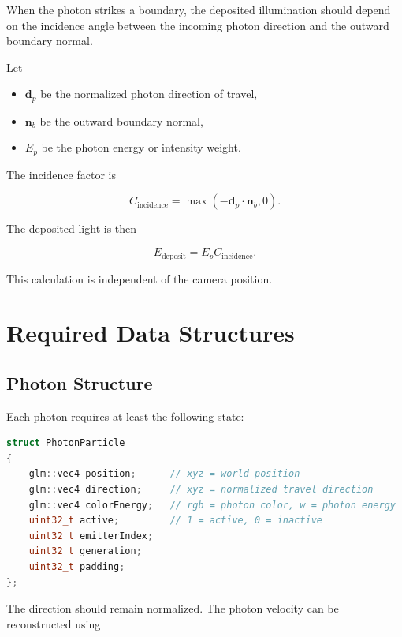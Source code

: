 \documentclass[11pt]{article}
\begin{document}
When the photon strikes a boundary, the deposited illumination should depend on
the incidence angle between the incoming photon direction and the outward
boundary normal.

Let

\begin{itemize}
    \item $\mathbf{d}_{p}$ be the normalized photon direction of travel,
    \item $\mathbf{n}_{b}$ be the outward boundary normal,
    \item $E_{p}$ be the photon energy or intensity weight.
\end{itemize}

The incidence factor is

\begin{equation}
    C_{\mathrm{incidence}}
    =
    \max\left(
        -\mathbf{d}_{p}\cdot\mathbf{n}_{b},
        0
    \right).
\end{equation}

The deposited light is then

\begin{equation}
    E_{\mathrm{deposit}}
    =
    E_{p}C_{\mathrm{incidence}}.
\end{equation}

This calculation is independent of the camera position.

\section{Required Data Structures}

\subsection{Photon Structure}

Each photon requires at least the following state:

\begin{lstlisting}[language=C++]
struct PhotonParticle
{
    glm::vec4 position;      // xyz = world position
    glm::vec4 direction;     // xyz = normalized travel direction
    glm::vec4 colorEnergy;   // rgb = photon color, w = photon energy
    uint32_t active;         // 1 = active, 0 = inactive
    uint32_t emitterIndex;
    uint32_t generation;
    uint32_t padding;
};
\end{lstlisting}

The direction should remain normalized. The photon velocity can be reconstructed
using
\end{document}
